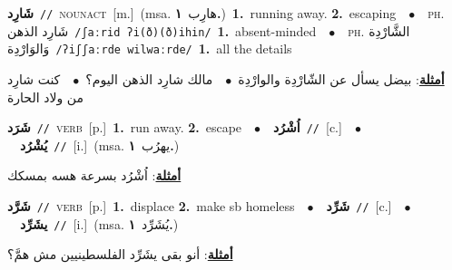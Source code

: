 \documentclass[10pt,a4paper,twoside]{article} %
\begin{document}
\begin{multicols}{2}
{\setlength\topsep{0pt}\textbf{\foreignlanguage{arabic}{شَارِد}}\ {\color{gray}\texttt{//}\color{black}}\ \textsc{noun\textunderscore act}\ [m.]\ \color{gray}(msa. \foreignlanguage{arabic}{هارِب}~\foreignlanguage{arabic}{\textbf{١.}})\color{black}\ \textbf{1.}~running away.  \textbf{2.}~escaping\ \ $\bullet$\ \ \textsc{ph.} \color{gray} \foreignlanguage{arabic}{شَارِد الذهن}\color{black}\ {\color{gray}\texttt{/{\sffamily ʃaːrid ʔi(ð)(ð)ihin}/}\color{black}}\ \textbf{1.}~absent-minded\ \ $\bullet$\ \ \textsc{ph.} \color{gray} \foreignlanguage{arabic}{الشَّارْدِة وَالوَارْدِة}\color{black}\ {\color{gray}\texttt{/{\sffamily ʔiʃʃaːrde wilwaːrde}/}\color{black}}\ \textbf{1.}~all the details\  \begin{flushright}\color{gray}\foreignlanguage{arabic}{\textbf{\underline{\foreignlanguage{arabic}{أمثلة}}}: بيضل يسأل عن الشّارْدِة والوارْدِة\ $\bullet$\ \  مالك شارِد الذهن اليوم؟\ $\bullet$\ \  كنت شارِد من ولاد الحارة}\end{flushright}\color{black}} \vspace{2mm}

{\setlength\topsep{0pt}\textbf{\foreignlanguage{arabic}{شَرَد}}\ {\color{gray}\texttt{//}\color{black}}\ \textsc{verb}\ [p.]\ \textbf{1.}~run away.  \textbf{2.}~escape\ \ $\bullet$\ \ \setlength\topsep{0pt}\textbf{\foreignlanguage{arabic}{اُشْرُد}}\ {\color{gray}\texttt{//}\color{black}}\ [c.]\ \ $\bullet$\ \ \setlength\topsep{0pt}\textbf{\foreignlanguage{arabic}{يُشْرُد}}\ {\color{gray}\texttt{//}\color{black}}\ [i.]\ \color{gray}(msa. \foreignlanguage{arabic}{يهرُب}~\foreignlanguage{arabic}{\textbf{١.}})\color{black}\  \begin{flushright}\color{gray}\foreignlanguage{arabic}{\textbf{\underline{\foreignlanguage{arabic}{أمثلة}}}: اُشْرُد بسرعة هسه بمسكك}\end{flushright}\color{black}} \vspace{2mm}

{\setlength\topsep{0pt}\textbf{\foreignlanguage{arabic}{شَرَّد}}\ {\color{gray}\texttt{//}\color{black}}\ \textsc{verb}\ [p.]\ \textbf{1.}~displace  \textbf{2.}~make sb homeless\ \ $\bullet$\ \ \setlength\topsep{0pt}\textbf{\foreignlanguage{arabic}{شَرِّد}}\ {\color{gray}\texttt{//}\color{black}}\ [c.]\ \ $\bullet$\ \ \setlength\topsep{0pt}\textbf{\foreignlanguage{arabic}{يشَرِّد}}\ {\color{gray}\texttt{//}\color{black}}\ [i.]\ \color{gray}(msa. \foreignlanguage{arabic}{يُشَرِّد}~\foreignlanguage{arabic}{\textbf{١.}})\color{black}\  \begin{flushright}\color{gray}\foreignlanguage{arabic}{\textbf{\underline{\foreignlanguage{arabic}{أمثلة}}}: أنو بقى يشَرِّد الفلسطينيين مش همَّ؟}\end{flushright}\color{black}} \vspace{2mm}


\end{multicols}
\end{document}
